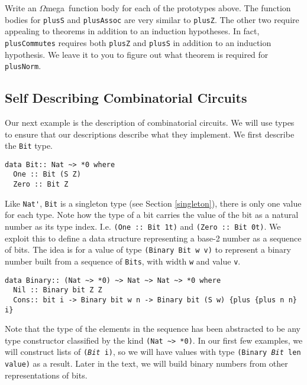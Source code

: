 \documentclass[11pt,twoside,A4]{llncs}
\newcommand{\om}{\emph{$\Omega$}mega}
\begin{document}
\begin{exercise}\label{convlemma}
Write an \om\ function body for each of the prototypes above. The function bodies
for {\tt plusS} and {\tt plusAssoc} are very similar to {\tt plusZ}.
The other two require appealing to theorems in addition to an induction
hypotheses. In fact, {\tt plusCommutes} requires both {\tt plusZ} and
{\tt plusS} in addition to an induction hypothesis. We leave it to you
to figure out what theorem is required for {\tt plusNorm}.
\end{exercise}

\subsection{Self Describing Combinatorial Circuits}

Our next example is the description of combinatorial circuits. We will use types
to ensure that our descriptions describe what they implement. We first describe the
{\tt Bit} type.

{\small
\begin{verbatim}
data Bit:: Nat ~> *0 where
  One :: Bit (S Z)
  Zero :: Bit Z
\end{verbatim}}

Like \verb+Nat'+, {\tt Bit} is a singleton type (see Section \ref{singleton}), there is only
one value for each type. Note how the type of a bit carries the 
value of the bit as a natural number as its type index. 
I.e.  \verb+(One :: Bit 1t)+  and \verb+(Zero :: Bit 0t)+.
We exploit this
to define a data structure representing a base-2 number
as a sequence of bits. The idea is for a value
of type \verb+(Binary Bit w v)+ to represent a binary number
built from a sequence of {\tt Bits}, with width \verb+w+ and value \verb+v+.

{\small
\begin{verbatim}
data Binary:: (Nat ~> *0) ~> Nat ~> Nat ~> *0 where
  Nil :: Binary bit Z Z
  Cons:: bit i -> Binary bit w n -> Binary bit (S w) {plus {plus n n} i}
\end{verbatim}}

Note that the type of the elements in the sequence has been abstracted
to be any type constructor classified by the kind \verb+(Nat ~> *0)+.
In our first few examples, we will construct lists of {\tt ({\it Bit}
i)}, so we will have values with type {\tt (Binary {\it Bit} len
value)} as a result. Later in the text, we will build binary numbers from
other representations of bits.
\end{document}
